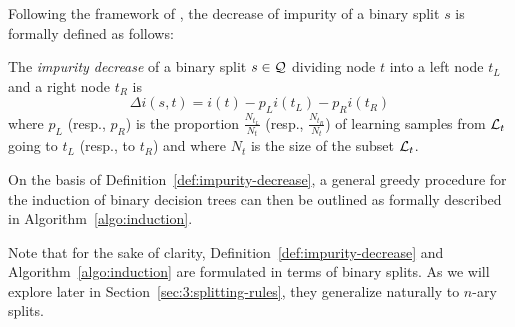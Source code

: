 Following the framework of \citet{breiman:1984}, the decrease of impurity
of a binary split $s$ is formally defined as follows:

\begin{definition}\label{def:impurity-decrease}
The \emph{impurity decrease} of a binary split $s \in {\cal Q}$ dividing node $t$ into
a left node $t_L$ and a right node $t_R$ is
\begin{equation}
\Delta i(s, t) = i(t) - p_L i(t_L) - p_R i(t_R)
\end{equation}
where $p_L$ (resp., $p_R$) is the proportion $\tfrac{N_{t_L}}{N_t}$ (resp., $\tfrac{N_{t_R}}{N_t}$)
of learning samples from ${\cal L}_t$ going to $t_L$ (resp., to $t_R$) and where $N_t$
is the size of the subset ${\cal L}_t$.
\end{definition}

On the basis of Definition~\ref{def:impurity-decrease}, a general greedy
procedure for the induction of binary decision trees can then be outlined as
formally described in Algorithm~\ref{algo:induction}.


Note that for the sake of clarity, Definition~\ref{def:impurity-decrease} and
Algorithm~\ref{algo:induction} are formulated in terms of binary splits. As
we will explore later in Section~\ref{sec:3:splitting-rules},
they generalize naturally to $n$-ary splits.


